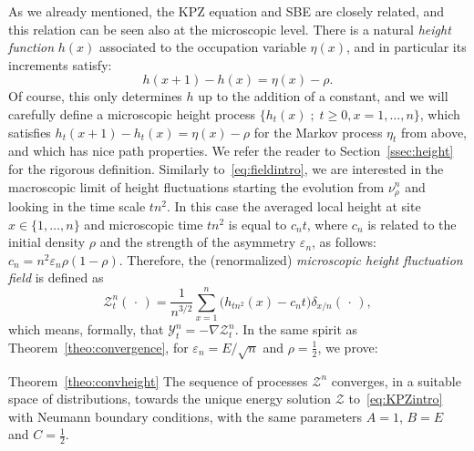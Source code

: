 \documentclass[10pt]{amsart}
\theoremstyle{definition}\newtheorem{defi}[theo]{Definition}\newtheorem{rema}[theo]{Remark}\newtheorem{exam}[theo]{Example}\newtheorem{exem}[theo]{Example}\newtheorem{nota}[theo]{Notation}
\newcommand{\mc}[1]{{\mathcal #1}}
\renewcommand{\mc}[1]{{\mathcal #1}}
\renewcommand{\geq}{\geqslant}
\begin{document}
As we already mentioned, the KPZ equation and SBE are closely related, and this relation can be seen also at the microscopic level. There is a natural \emph{height function} $h(x)$ associated to the occupation variable $\eta(x)$, and in particular its increments satisfy:
\[
h(x+1)-h(x) = \eta(x) -\rho.
\]
Of course, this only determines $h$ up to the addition of a constant, and we will carefully define a microscopic height process $\{h_t(x)\; ; \; t \geq 0, x=1,\dots,n\}$, which satisfies $h_t(x+1)-h_t(x) = \eta(x) -\rho$ for the Markov process $\eta_t$ from above, and which has nice path properties. We refer the reader to Section~\ref{ssec:height} for the rigorous definition. Similarly to~\eqref{eq:fieldintro}, we are interested in the macroscopic limit of height fluctuations starting the evolution from $\nu_\rho^n$ and looking in the time scale $tn^2$. In this case the averaged local height at site $x \in \{1,\dots,n\}$ and microscopic time $tn^2$ is equal to $c_n t$, where $c_n$ is related to the initial density $\rho$ and the strength of the asymmetry $\varepsilon_n$, as follows: $c_n=n^2\varepsilon_n\rho(1-\rho)$. Therefore, the (renormalized) \emph{microscopic height fluctuation field} is defined as
\begin{equation}\label{eq:height-field-intro}
\mc Z_t^n({\,\cdot\,}) = \frac{1}{n^{3/2}} \sum_{x=1}^n \big(h_{tn^2}(x)-c_n t\big)\delta_{x/n}({\,\cdot\,}),
\end{equation}
which means, formally, that $\mc Y_t^n = -\nabla \mc Z_t^n$. In the same spirit as Theorem~\ref{theo:convergence}, for $\varepsilon_n=E/\sqrt n$ and $\rho=\frac12$, we prove:

\begin{enonce*}{Theorem~\ref{theo:convheight}}
The sequence of processes $\mc Z^n$ converges, in a suitable space of distributions, towards the unique energy solution $\mc Z$ to~\eqref{eq:KPZintro} with Neumann boundary conditions, with the same parameters $A=1$, $B=E$ and $C=\frac12$.
\end{enonce*}
\end{document}
